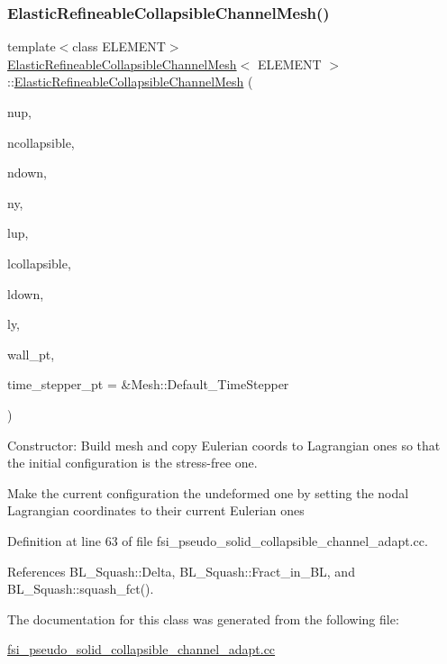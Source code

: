 \subsubsection{\texorpdfstring{Elastic\+Refineable\+Collapsible\+Channel\+Mesh()}{ElasticRefineableCollapsibleChannelMesh()}}
{\footnotesize\ttfamily template$<$class E\+L\+E\+M\+E\+NT$>$ \\
\hyperlink{classElasticRefineableCollapsibleChannelMesh}{Elastic\+Refineable\+Collapsible\+Channel\+Mesh}$<$ E\+L\+E\+M\+E\+NT $>$\+::\hyperlink{classElasticRefineableCollapsibleChannelMesh}{Elastic\+Refineable\+Collapsible\+Channel\+Mesh} (\begin{DoxyParamCaption}\item[{const unsigned \&}]{nup,  }\item[{const unsigned \&}]{ncollapsible,  }\item[{const unsigned \&}]{ndown,  }\item[{const unsigned \&}]{ny,  }\item[{const double \&}]{lup,  }\item[{const double \&}]{lcollapsible,  }\item[{const double \&}]{ldown,  }\item[{const double \&}]{ly,  }\item[{Geom\+Object $\ast$}]{wall\+\_\+pt,  }\item[{Time\+Stepper $\ast$}]{time\+\_\+stepper\+\_\+pt = {\ttfamily \&Mesh\+:\+:Default\+\_\+TimeStepper} }\end{DoxyParamCaption})\hspace{0.3cm}{\ttfamily [inline]}}



Constructor\+: Build mesh and copy Eulerian coords to Lagrangian ones so that the initial configuration is the stress-\/free one. 

Make the current configuration the undeformed one by setting the nodal Lagrangian coordinates to their current Eulerian ones 

Definition at line 63 of file fsi\+\_\+pseudo\+\_\+solid\+\_\+collapsible\+\_\+channel\+\_\+adapt.\+cc.



References B\+L\+\_\+\+Squash\+::\+Delta, B\+L\+\_\+\+Squash\+::\+Fract\+\_\+in\+\_\+\+BL, and B\+L\+\_\+\+Squash\+::squash\+\_\+fct().



The documentation for this class was generated from the following file\+:\begin{DoxyCompactItemize}
\item 
\hyperlink{fsi__pseudo__solid__collapsible__channel__adapt_8cc}{fsi\+\_\+pseudo\+\_\+solid\+\_\+collapsible\+\_\+channel\+\_\+adapt.\+cc}\end{DoxyCompactItemize}
